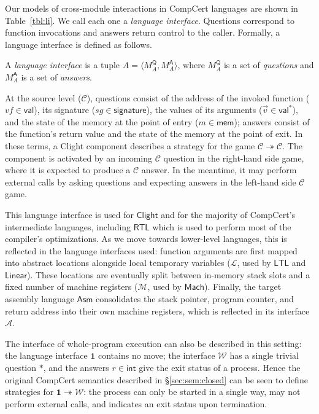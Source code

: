 \documentclass[sigplan,10pt,review,anonymous]{acmart}\settopmatter{printfolios=true,printccs=false,printacmref=false}
\newcommand{\kw}[1]{\ensuremath{ \mathsf{#1} }}
\begin{document}
Our models of cross-module interactions in CompCert languages
are shown in Table~\ref{tbl:li}.
We call each one a \emph{language interface}.
Questions correspond to function invocations
and answers return control to the caller.
Formally,
a language interface is defined as follows.

\begin{definition}
A \emph{language interface} is a tuple
$A = \langle M_A^\kw{Q}, M_A^\kw{A} \rangle$, where
$M_A^\kw{Q}$ is a set of \emph{questions} and
$M_A^\kw{A}$ is a set of \emph{answers}.
\end{definition}

At the source level ($\mathcal{C}$),
questions consist of
the address of the invoked function
($\mathit{vf} \in \kw{val}$),
its signature
($\mathit{sg} \in \kw{signature}$),
the values of its arguments
($\vec{v} \in \kw{val}^*$),
and the state of the memory at the point of entry
($m \in \kw{mem}$);
answers
consist of the function's return value
and the state of the memory at the point of exit.
In these terms,
a Clight component describes a strategy for the game
$\mathcal{C} \twoheadrightarrow \mathcal{C}$.
The component is activated by an incoming $\mathcal{C}$ question
in the right-hand side game,
where it is expected to produce a $\mathcal{C}$ answer.
In the meantime,
it may perform external calls by
asking questions and expecting answers
in the left-hand side $\mathcal{C}$ game.

This language interface is used for \kw{Clight} and
for the majority of CompCert's intermediate languages,
including \kw{RTL} which is used to perform
most of the compiler's optimizations.
As we move towards lower-level languages,
this is reflected in the language interfaces used:
function arguments are first mapped into
abstract locations alongside local temporary variables
($\mathcal{L}$, used by \kw{LTL} and \kw{Linear}).
These locations are eventually split between
in-memory stack slots and a fixed number of machine registers
($\mathcal{M}$, used by \kw{Mach}).
Finally, the target assembly language \kw{Asm}
consolidates the stack pointer, program counter,
and return address into their own machine registers,
which is reflected in its interface $\mathcal{A}$.

The interface of whole-program execution
can also be described in this setting:
the language interface $\mathbf{1}$ contains no move;
the interface $\mathcal{W}$ has a single trivial question $*$,
and the answers $r \in \kw{int}$
give the exit status of a process.
Hence the original CompCert semantics described in
\S\ref{sec:sem:closed}
can be seen to define strategies for
$\mathbf{1} \twoheadrightarrow \mathcal{W}$:
the process can only be started in a single way,
may not perform external calls,
and indicates an exit status upon termination.
\end{document}
